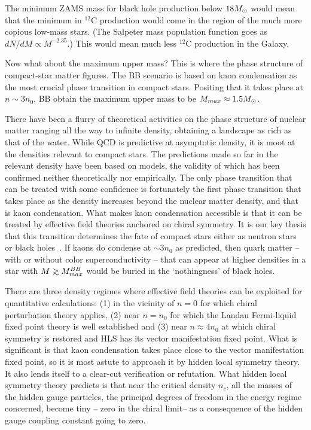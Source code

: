 \documentclass[aps,twocolumn,preprintnumbers,%
superscriptaddress,floatfix]{revtex4}
\begin{document}
The minimum ZAMS mass for black hole production below $18\mbox{$M_\odot$}$  would mean that the minimum in $^{12}$C production would come in the region of the much more copious low-mass stars. (The Salpeter mass population function goes as $dN/dM \propto M^{-2.35}$.)
This would mean much less $^{12}$C production in the Galaxy.

Now what about the maximum upper mass? This is where the phase structure of compact-star matter figures. The BB scenario is based on kaon condensation as the most crucial phase transition in compact stars. Positing that it takes place at $n\sim 3n_0$, BB obtain the maximum upper mass to be $M_{max}\approx 1.5\mbox{$M_\odot$}$.

There have been a flurry of theoretical activities on the phase
structure of nuclear matter ranging all the way to infinite density,
obtaining a landscape as rich as that of the water. While QCD is
predictive at asymptotic density, it is moot at the densities
relevant to compact stars. The predictions made so far in the
relevant density have been based on models, the validity of which
has been confirmed neither theoretically nor empirically. The only
phase transition that can be treated with some confidence is
fortunately the first phase transition that takes place as the
density increases beyond the nuclear matter density, and that is
kaon condensation. What makes kaon condensation accessible is that
it can be treated by effective field theories anchored on chiral
symmetry. It is our key thesis that this transition determines the
fate of compact stars either as neutron stars or black
holes~\cite{BLR-kaon07}. If kaons do condense at $\sim 3n_0$ as
predicted, then quark matter -- with or without color
superconductivity -- that can appear at higher densities in a star
with $M\gsim M_{max}^{BB}$ would be buried in the `nothingness' of
black holes.

There are three density regimes where effective field theories can
be exploited for quantitative calculations: (1) in the vicinity of
$n=0$ for which chiral perturbation theory applies, (2) near $n=n_0$
for which the Landau Fermi-liquid fixed point theory is well
established and (3) near $n\approx 4n_0$  at which chiral symmetry
is restored and HLS has its vector manifestation fixed point. What
is significant is that kaon condensation takes place close to the
vector manifestation fixed point, so it is most astute to approach
it by hidden local symmetry theory. It also lends itself to a
clear-cut verification or  refutation. What hidden local symmetry
theory predicts is that near the critical density $n_c$, all the
masses of the hidden gauge particles, the principal degrees of
freedom in the energy regime concerned,  become tiny -- zero in the
chiral limit--  as a consequence of the hidden gauge coupling
constant going to zero.
\end{document}
